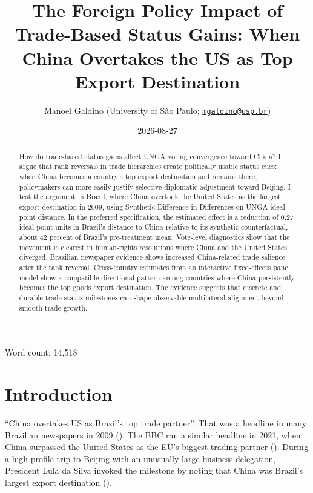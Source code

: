 \documentclass[
  12pt,
]{article}
\title{The Foreign Policy Impact of Trade-Based Status Gains: When China Overtakes the US as Top Export Destination}
\author{Manoel Galdino (University of São Paulo; \href{mailto:mgaldino@usp.br}{\nolinkurl{mgaldino@usp.br}})}
\date{2026-08-27}
\begin{document}
\maketitle
\begin{abstract}
\singlespacing  How do trade-based status gains affect UNGA voting convergence toward China? I argue that rank reversals in trade hierarchies create politically usable status cues: when China becomes a country's top export destination and remains there, policymakers can more easily justify selective diplomatic adjustment toward Beijing. I test the argument in Brazil, where China overtook the United States as the largest export destination in 2009, using Synthetic Difference-in-Differences on UNGA ideal-point distance. In the preferred specification, the estimated effect is a reduction of 0.27 ideal-point units in Brazil's distance to China relative to its synthetic counterfactual, about 42 percent of Brazil's pre-treatment mean. Vote-level diagnostics show that the movement is clearest in human-rights resolutions where China and the United States diverged. Brazilian newspaper evidence shows increased China-related trade salience after the rank reversal. Cross-country estimates from an interactive fixed-effects panel model show a compatible directional pattern among countries where China persistently becomes the top goods export destination. The evidence suggests that discrete and durable trade-status milestones can shape observable multilateral alignment beyond smooth trade growth.
\end{abstract}

{
\setcounter{tocdepth}{2}
\tableofcontents
}
\pagebreak

Word count: 14,518

\section{Introduction}\label{introduction}

``China overtakes US as Brazil's top trade partner''. That was a headline in many Brazilian newspapers in 2009 (). The BBC ran a similar headline in 2021, when China surpassed the United States as the EU's biggest trading partner (). During a high-profile trip to Beijing with an unusually large business delegation, President Lula da Silva invoked the milestone by noting that China was Brazil's largest export destination ().
\end{document}
